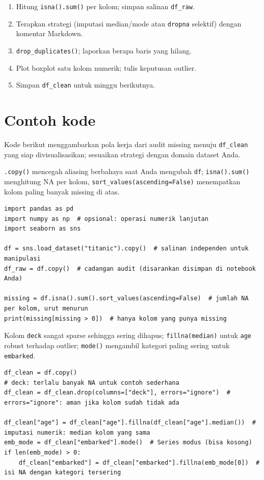 \documentclass[../main.tex]{subfiles}
\begin{document}
\begin{enumerate}[leftmargin=*]
  \item Hitung \texttt{isna().sum()} per kolom; simpan salinan \texttt{df\_raw}.
  \item Terapkan strategi (imputasi median/mode atau \texttt{dropna} selektif) dengan komentar Markdown.
  \item \texttt{drop\_duplicates()}; laporkan berapa baris yang hilang.
  \item Plot boxplot satu kolom numerik; tulis keputusan outlier.
  \item Simpan \texttt{df\_clean} untuk minggu berikutnya.
\end{enumerate}

\section{Contoh kode}

Kode berikut menggambarkan pola kerja dari audit missing menuju \texttt{df\_clean} yang siap divisualisasikan; sesuaikan strategi dengan domain dataset Anda.

\MulaiPenjelasanKode \texttt{.copy()} mencegah aliasing berbahaya saat Anda mengubah \texttt{df}; \texttt{isna().sum()} menghitung NA per kolom, \texttt{sort\_values(ascending=False)} menempatkan kolom paling banyak missing di atas. \SelesaiPenjelasanKode

\begin{lstlisting}[caption=Muat Titanic dan audit missing values]
import pandas as pd
import numpy as np  # opsional: operasi numerik lanjutan
import seaborn as sns

df = sns.load_dataset("titanic").copy()  # salinan independen untuk manipulasi
df_raw = df.copy()  # cadangan audit (disarankan disimpan di notebook Anda)

missing = df.isna().sum().sort_values(ascending=False)  # jumlah NA per kolom, urut menurun
print(missing[missing > 0])  # hanya kolom yang punya missing
\end{lstlisting}

\MulaiPenjelasanKode Kolom \texttt{deck} sangat sparse sehingga sering dihapus; \texttt{fillna(median)} untuk \texttt{age} robust terhadap outlier; \texttt{mode()} mengambil kategori paling sering untuk \texttt{embarked}. \SelesaiPenjelasanKode

\begin{lstlisting}[caption=Hapus kolom sangat sparse; imputasi terarah]
df_clean = df.copy()
# deck: terlalu banyak NA untuk contoh sederhana
df_clean = df_clean.drop(columns=["deck"], errors="ignore")  # errors="ignore": aman jika kolom sudah tidak ada

df_clean["age"] = df_clean["age"].fillna(df_clean["age"].median())  # imputasi numerik: median kolom yang sama
emb_mode = df_clean["embarked"].mode()  # Series modus (bisa kosong)
if len(emb_mode) > 0:
    df_clean["embarked"] = df_clean["embarked"].fillna(emb_mode[0])  # isi NA dengan kategori tersering
\end{lstlisting}
\end{document}

